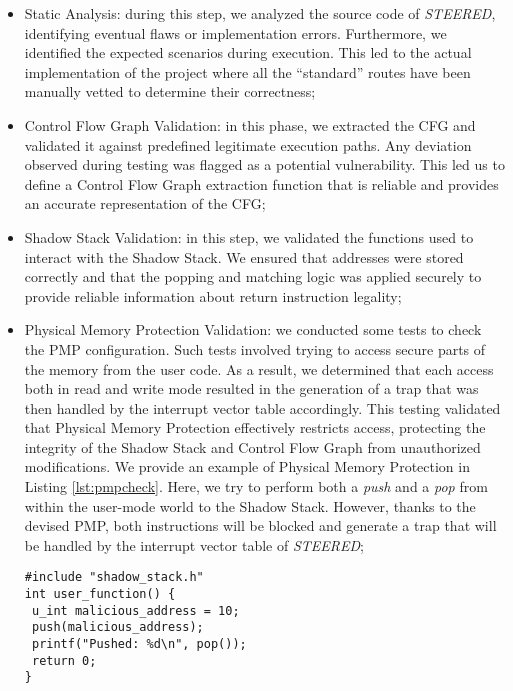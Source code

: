 \begin{itemize}
  \item Static Analysis: during this step, we analyzed the source code of \textit{STEERED},
    identifying eventual flaws or implementation errors. Furthermore, we identified
    the expected scenarios during execution. This led to the actual
    implementation of the project where all the ``standard'' routes have been
    manually vetted to determine their correctness;

  \item Control Flow Graph Validation: in this phase, we extracted the CFG and validated
    it against predefined legitimate execution paths. Any deviation observed
    during testing was flagged as a potential vulnerability. This led us to define
    a Control Flow Graph extraction function that is reliable and provides an accurate
    representation of the CFG;

  \item Shadow Stack Validation: in this step, we validated the functions used to
    interact with the Shadow Stack. We ensured that addresses were stored
    correctly and that the popping and matching logic was applied securely to
    provide reliable information about return instruction legality;

  \item Physical Memory Protection Validation: we conducted some tests to check
    the PMP configuration. Such tests involved trying to access secure parts of the
    memory from the user code. As a result, we determined that each access both in
    read and write mode resulted in the generation of a trap that was then handled
    by the interrupt vector table accordingly. This testing validated that
    Physical Memory Protection effectively restricts access, protecting the integrity
    of the Shadow Stack and Control Flow Graph from unauthorized modifications.
    We provide an example of Physical Memory Protection in Listing
    \ref{lst:pmpcheck}. Here, we try to perform both a \textit{push} and a \textit{pop}
    from within the user-mode world to the Shadow Stack. However, thanks to the
    devised PMP, both instructions will be blocked and generate a trap that will
    be handled by the interrupt vector table of \textit{STEERED};

    \begin{lstlisting}[style=CStyle, caption = PMP configuration validation, label={lst:pmpcheck}]
#include "shadow_stack.h"
int user_function() {
 u_int malicious_address = 10;
 push(malicious_address);
 printf("Pushed: %d\n", pop());
 return 0;
}
 \end{lstlisting}


\end{itemize}
